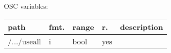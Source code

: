 \begin{snugshade}
{\footnotesize
\label{osctab:receivermodnsp}
OSC variables:
\nopagebreak

\begin{tabularx}{\textwidth}{llllX}
\hline
path & fmt. & range & r. & description\\
\hline
/.../useall & i & bool & yes & \\
\hline
\end{tabularx}
}
\end{snugshade}
